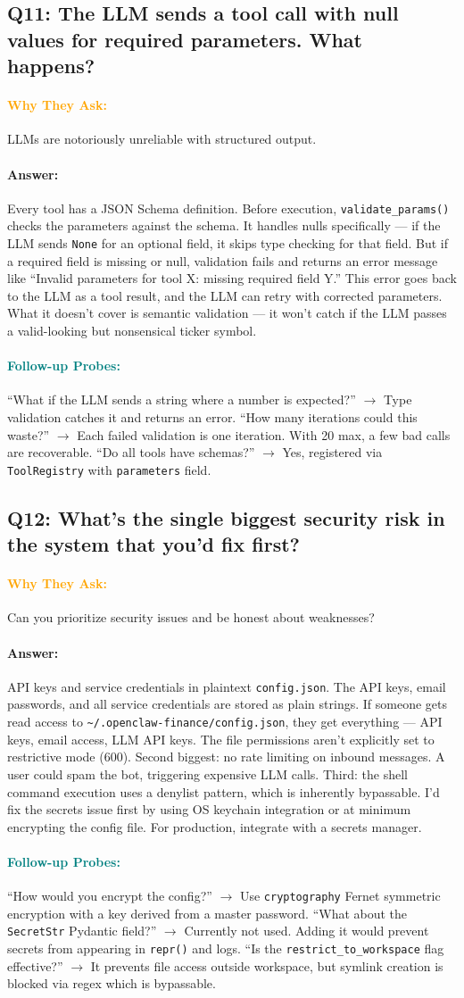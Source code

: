 \documentclass[11pt,a4paper]{article}
\newcommand{\Q}[1]{\subsection{#1}}
\newcommand{\Ans}[1]{\paragraph{\textbf{Answer:}} #1}
\newcommand{\Why}{\paragraph{\textcolor{orange}{\textbf{Why They Ask:}}}}
\newcommand{\Probe}{\paragraph{\textcolor{teal}{\textbf{Follow-up Probes:}}}}
\begin{document}
\Q{Q11: The LLM sends a tool call with null values for required parameters. What happens?}
\Why LLMs are notoriously unreliable with structured output.
\Ans Every tool has a JSON Schema definition. Before execution, \texttt{validate\_params()} checks the parameters against the schema. It handles nulls specifically --- if the LLM sends \texttt{None} for an optional field, it skips type checking for that field. But if a required field is missing or null, validation fails and returns an error message like ``Invalid parameters for tool X: missing required field Y.'' This error goes back to the LLM as a tool result, and the LLM can retry with corrected parameters. What it doesn't cover is semantic validation --- it won't catch if the LLM passes a valid-looking but nonsensical ticker symbol.
\Probe ``What if the LLM sends a string where a number is expected?'' $\rightarrow$ Type validation catches it and returns an error. ``How many iterations could this waste?'' $\rightarrow$ Each failed validation is one iteration. With 20 max, a few bad calls are recoverable. ``Do all tools have schemas?'' $\rightarrow$ Yes, registered via \texttt{ToolRegistry} with \texttt{parameters} field.

\Q{Q12: What's the single biggest security risk in the system that you'd fix first?}
\Why Can you prioritize security issues and be honest about weaknesses?
\Ans API keys and service credentials in plaintext \texttt{config.json}. The API keys, email passwords, and all service credentials are stored as plain strings. If someone gets read access to \texttt{\textasciitilde/.openclaw-finance/config.json}, they get everything --- API keys, email access, LLM API keys. The file permissions aren't explicitly set to restrictive mode (600). Second biggest: no rate limiting on inbound messages. A user could spam the bot, triggering expensive LLM calls. Third: the shell command execution uses a denylist pattern, which is inherently bypassable. I'd fix the secrets issue first by using OS keychain integration or at minimum encrypting the config file. For production, integrate with a secrets manager.
\Probe ``How would you encrypt the config?'' $\rightarrow$ Use \texttt{cryptography} Fernet symmetric encryption with a key derived from a master password. ``What about the \texttt{SecretStr} Pydantic field?'' $\rightarrow$ Currently not used. Adding it would prevent secrets from appearing in \texttt{repr()} and logs. ``Is the \texttt{restrict\_to\_workspace} flag effective?'' $\rightarrow$ It prevents file access outside workspace, but symlink creation is blocked via regex which is bypassable.
\end{document}
